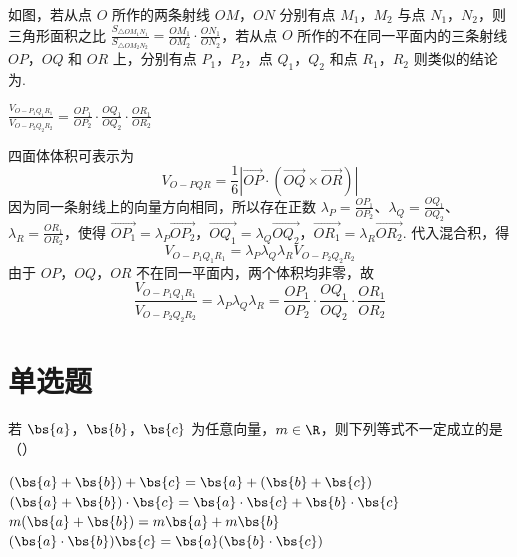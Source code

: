 \begin{problem}
如图，若从点 \(O\) 所作的两条射线 \(OM\)，\(ON\) 分别有点 \(M_{1}\)，\(M_{2}\) 与点 \(N_{1}\)，\(N_{2}\)，则三角形面积之比 \(\frac{S_{\triangle O M_{1}N_{1}}}{S_{\triangle O M_{2}N_{2}}} = \frac{OM_{1}}{OM_{2}} \cdot \frac{ON_{1}}{ON_{2}}\)，若从点 \(O\) 所作的不在同一平面内的三条射线 \(OP\)，\(OQ\) 和 \(OR\) 上，分别有点 \(P_{1}\)，\(P_{2}\)，点 \(Q_{1}\)，\(Q_{2}\) 和点 \(R_{1}\)，\(R_{2}\) 则类似的结论为\fillinblank{}.

\end{problem}

\begin{answer}
\(\frac{V_{O-P_{1}Q_{1}R_{1}}}{V_{O-P_{2}Q_{2}R_{2}}} = \frac{OP_{1}}{OP_{2}} \cdot \frac{OQ_{1}}{OQ_{2}} \cdot \frac{OR_{1}}{OR_{2}}\)
\end{answer}

\begin{solution}
四面体体积可表示为
\[
V_{O-PQR}=\frac16\left|\overrightarrow{OP}\cdot\left(\overrightarrow{OQ}\times\overrightarrow{OR}\right)\right|
\]
因为同一条射线上的向量方向相同，所以存在正数 \(\lambda_P=\frac{OP_1}{OP_2}\)、\(\lambda_Q=\frac{OQ_1}{OQ_2}\)、\(\lambda_R=\frac{OR_1}{OR_2}\)，使得
\(\overrightarrow{OP_1}=\lambda_P\overrightarrow{OP_2}\)，\(\overrightarrow{OQ_1}=\lambda_Q\overrightarrow{OQ_2}\)，\(\overrightarrow{OR_1}=\lambda_R\overrightarrow{OR_2}\).
代入混合积，得
\[
V_{O-P_1Q_1R_1}=\lambda_P\lambda_Q\lambda_R V_{O-P_2Q_2R_2}
\]
由于 \(OP\)，\(OQ\)，\(OR\) 不在同一平面内，两个体积均非零，故
\[
\frac{V_{O-P_1Q_1R_1}}{V_{O-P_2Q_2R_2}}=\lambda_P\lambda_Q\lambda_R=\frac{OP_1}{OP_2}\cdot\frac{OQ_1}{OQ_2}\cdot\frac{OR_1}{OR_2}
\]
\end{solution}

\section{单选题}
\begin{problem}
若 \(\bs{a}\)，\(\bs{b}\)，\(\bs{c}\) 为任意向量，\(m \in \R\)，则下列等式不一定成立的是（\quad）

\choices
    {\((\bs{a} + \bs{b}) + \bs{c} = \bs{a} + (\bs{b} + \bs{c})\)}
    {\((\bs{a} + \bs{b}) \cdot \bs{c} = \bs{a} \cdot \bs{c} + \bs{b} \cdot \bs{c}\)}
    {\(m(\bs{a} + \bs{b}) = m\bs{a} + m\bs{b}\)}
    {\((\bs{a}\cdot \bs{b})\bs{c} = \bs{a}(\bs{b}\cdot \bs{c})\)}
\end{problem}

